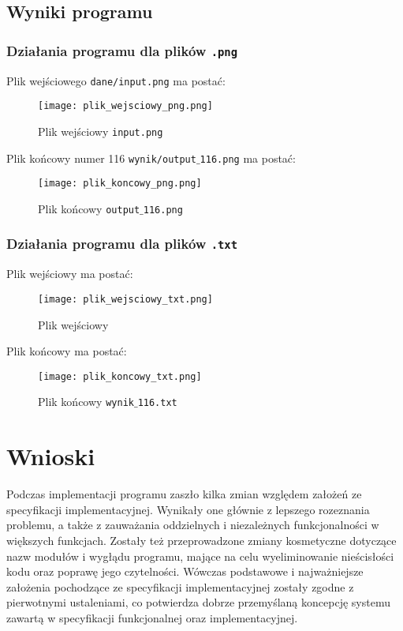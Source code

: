 \documentclass[a4paper, 12pt]{article}
\begin{document}
		\subsection{Wyniki programu}
			\subsubsection{Działania  programu dla plików \texttt{.png}}
			\hspace*{1cm} Plik wejściowego \texttt{dane/input.png} ma postać:
		\begin{figure}[h]
			\texttt{[image: plik\_wejsciowy\_png.png]}
			\caption{Plik wejściowy \texttt{input.png}}
		\end{figure}
\newpage
			\hspace*{1cm} Plik końcowy numer 116 \texttt{wynik/output$\_$116.png} ma postać:
		\begin{figure}[h]
			\texttt{[image: plik\_koncowy\_png.png]}
			\caption{Plik końcowy \texttt{output$\_$116.png}}
		\end{figure}
\newpage
			\subsubsection{Działania programu dla plików \texttt{.txt}}
			\hspace*{1cm} Plik wejściowy ma postać:
		\begin{figure}[h]
			\texttt{[image: plik\_wejsciowy\_txt.png]}
			\caption{Plik wejściowy}
		\end{figure}
\newpage
			\hspace*{1cm} Plik końcowy ma postać:
		\begin{figure}[h]
			\texttt{[image: plik\_koncowy\_txt.png]}
			\caption{Plik końcowy \texttt{wynik$\_$116.txt}}
		\end{figure}
\newpage
	\section{Wnioski}
			\hspace*{1cm} Podczas implementacji programu zaszło kilka zmian względem założeń ze specyfikacji implementacyjnej. Wynikały one głównie z lepszego rozeznania problemu, a także z zauważania oddzielnych i niezależnych funkcjonalności w większych funkcjach. Zostały też przeprowadzone zmiany kosmetyczne dotyczące nazw modułów i wygłądu programu, mające na celu wyeliminowanie nieścisłości kodu oraz poprawę jego czytelności. Wówczas podstawowe i najważniejsze założenia pochodzące ze specyfikacji implementacyjnej zostały zgodne z pierwotnymi ustaleniami, co potwierdza dobrze przemyślaną koncepcję systemu zawartą w specyfikacji funkcjonalnej oraz implementacyjnej. 
		

\label{LastPage}~
\label{LastPageOfBackMatter}~		
\end{document}
